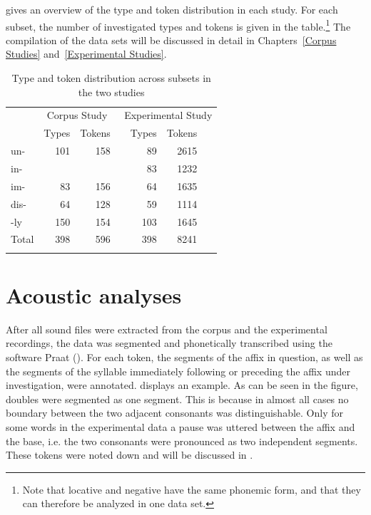  gives an overview of the type and token distribution in each study. For each subset, the number of investigated types and tokens is given in the table.\footnote{Note that locative and negative   have the same phonemic form, and that they can therefore be analyzed in one data set.} The compilation of the data sets will be discussed in detail in Chapters~\ref{Corpus Studies} and~\ref{Experimental Studies}.


\begin{table}
	\caption{Type and token distribution across subsets in the two studies}
	\label{tbl:token distribution both studies}
        \begin{tabular}{lrrcrrc}
		\lsptoprule	
		&	\multicolumn{2}{c}{Corpus Study} &\multicolumn{4}{r}{Experimental Study} \\\cmidrule(lr){2-3}\cmidrule(lr){4-7} 
        & Types & Tokens & & Types & Tokens & \\
			\midrule
			{un-}  & 101&158   & &89    & 2615 & ~\\
			{in-}  &    &      & & 83   & 1232 & ~\\ 
			{im-}  & 83 &  156 & &  64  & 1635 & ~\\ 
			{dis-} &  64&  128 & &59    & 1114 & ~\\ 
			{-ly}  & 150&  154 & & 103  & 1645 & ~\\ 
			\midrule
			Total & 398 & 596& & 398& 8241 &\\
			\lspbottomrule
			\end{tabular}
\end{table}

\section{Acoustic analyses}\label{Acoustic Analysis}
After all sound files were extracted from the corpus and the experimental recordings, the data was segmented and phonetically transcribed using the software Praat (\citealt{Boersma.2014}). For each token, the segments of the affix in question, as well as the segments of the syllable immediately following or preceding the affix under investigation, were annotated.  displays an example. As can be seen in the figure, doubles were segmented as one segment. This is because in almost all cases no boundary between the two adjacent consonants was distinguishable. Only for some words in the experimental data a pause was uttered between the affix and the base, i.e. the two consonants were pronounced as two independent segments. These tokens were noted down and will be discussed in .

